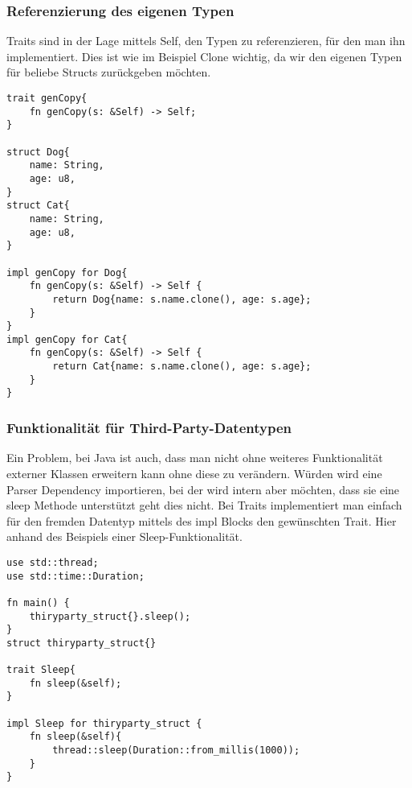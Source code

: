 \documentclass[a4paper, 1ppt]{article}
\begin{document}
\subsubsection{Referenzierung des eigenen Typen}
Traits sind in der Lage mittels Self, den Typen zu referenzieren, für den man ihn implementiert.
Dies ist wie im Beispiel Clone wichtig, da wir den eigenen Typen für beliebe Structs zurückgeben möchten.
\begin{verbatim}
trait genCopy{
    fn genCopy(s: &Self) -> Self;
}

struct Dog{
    name: String,
    age: u8,
}
struct Cat{
    name: String,
    age: u8,
}

impl genCopy for Dog{
    fn genCopy(s: &Self) -> Self {
        return Dog{name: s.name.clone(), age: s.age};
    }
}
impl genCopy for Cat{
    fn genCopy(s: &Self) -> Self {
        return Cat{name: s.name.clone(), age: s.age};
    }
}
\end{verbatim}
\subsubsection{Funktionalität für Third-Party-Datentypen}
Ein Problem, bei Java ist auch, dass man nicht ohne weiteres Funktionalität externer Klassen erweitern kann ohne diese zu verändern.
Würden wird eine Parser Dependency importieren, bei der wird intern aber möchten, dass sie eine sleep Methode unterstützt geht dies nicht.
Bei Traits implementiert man einfach für den fremden Datentyp mittels des impl Blocks den gewünschten Trait.
Hier anhand des Beispiels einer Sleep-Funktionalität.
\begin{verbatim}
use std::thread;
use std::time::Duration;

fn main() {
    thiryparty_struct{}.sleep();
}
struct thiryparty_struct{}

trait Sleep{
    fn sleep(&self);
}

impl Sleep for thiryparty_struct {
    fn sleep(&self){
        thread::sleep(Duration::from_millis(1000));
    }
}
\end{verbatim}
\end{document}
